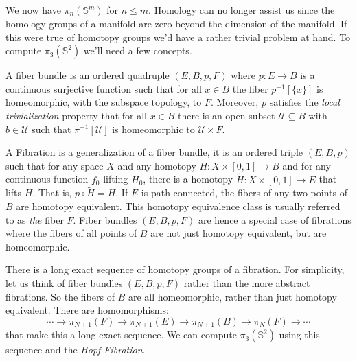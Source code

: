 \documentclass{beamer}
\begin{document}
    \begin{frame}
        We now have $\pi_{n}(\mathbb{S}^{m})$ for $n\leq{m}$. Homology can no
        longer assist us since the homology groups of a manifold are zero beyond
        the dimension of the manifold. If this were true of homotopy groups we'd
        have a rather trivial problem at hand. To compute
        $\pi_{3}(\mathbb{S}^{2})$ we'll need a few concepts.
        \par\hfill\par
        A fiber bundle is an ordered quadruple
        $(E,B,p,F)$ where $p:E\rightarrow{B}$ is a continuous surjective
        function such that for all $x\in{B}$ the fiber $p^{-1}[\{x\}]$ is
        homeomorphic, with the subspace topology, to $F$. Moreover, $p$
        satisfies the \textit{local trivialization} property that for all
        $x\in{B}$ there is an open subset $\mathcal{U}\subseteq{B}$ with
        $b\in\mathcal{U}$ such that
        $\pi^{-1}[\mathcal{U}]$ is homeomorphic to $\mathcal{U}\times{F}$.
    \end{frame}
    \begin{frame}
        A Fibration is a generalization of a fiber bundle, it is an ordered
        triple $(E,B,p)$ such that for any space $X$ and any homotopy
        $H:X\times[0,1]\rightarrow{B}$ and for any continuous function
        $\tilde{f}_{0}$ lifting $H_{0}$, there is a homotopy
        $\tilde{H}:X\times[0,1]\rightarrow{E}$ that lifts $H$. That is,
        $p\circ\tilde{H}=H$. If $E$ is path connected, the fibers of any two
        points of $B$ are homotopy equivalent. This homotopy equivalence class
        is usually referred to as \textit{the} fiber $F$. Fiber bundles
        $(E,B,p,F)$ are hence a special case of fibrations where the fibers of
        all points of $B$ are not just homotopy equivalent, but are
        homeomorphic.
    \end{frame}
    \begin{frame}
        There is a long exact sequence of homotopy groups of a fibration. For
        simplicity, let us think of fiber bundles $(E,B,p,F)$ rather than the
        more abstract fibrations. So the fibers of $B$ are all homeomorphic,
        rather than just homotopy equivalent. There are homomorphisms:
        \begin{equation}
            \cdots\rightarrow
                \pi_{N+1}(F)\rightarrow\pi_{N+1}(E)\rightarrow\pi_{N+1}(B)
                \rightarrow\pi_{N}(F)\rightarrow\cdots
        \end{equation}
        that make this a long exact sequence. We can compute
        $\pi_{3}(\mathbb{S}^{2})$ using this sequence and the
        \textit{Hopf Fibration}.
    \end{frame}
\end{document}
